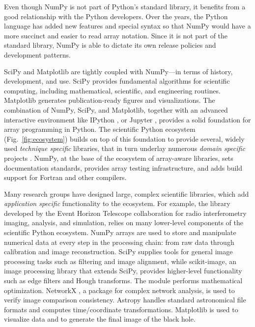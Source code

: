 Even though NumPy is not part of Python's standard library,
it benefits from a good relationship with the Python developers.
Over the years, the Python language has added new features and
special syntax so that NumPy would have a more succinct and 
easier to read array notation.
Since it is not part of the standard library, NumPy is able to
dictate its own release policies and development patterns.

SciPy and Matplotlib are tightly coupled with NumPy---in terms of
history, development, and use.
SciPy provides fundamental algorithms for scientific computing,
including mathematical, scientific, and engineering routines.
Matplotlib generates publication-ready figures and visualizations.
The combination of NumPy, SciPy, and Matplotlib, together with
an advanced interactive environment like IPython \cite{perez2007ipython},
or Jupyter \cite{Kluyver:2016aa}, provides a solid foundation for array
programming in Python.
The scientific Python ecosystem (Fig.~\ref{fig:ecosystem}) builds on top of
this foundation to provide several, widely used \emph{technique specific}
libraries\cite{pedregosa2011scikit,vanderwalt2014scikit,SciPyProceedings_11},
that in turn underlay numerous \emph{domain specific} projects
\cite{astropy:2013,astropy:2018,cock2009biopython,millman2007analysis,sunpy2015,2018EGUGA..2012146H}.
NumPy, at the base of the ecosystem of array-aware libraries,
sets documentation standards, provides array testing infrastructure,
and adds build support for Fortran and other compilers.

Many research groups have designed large,
complex scientific libraries, which add \emph{application specific} functionality
to the ecosystem.
For example, the  library \cite{chael2019ehtim} developed by
the Event Horizon Telescope collaboration for radio interferometry imaging,
analysis, and simulation, relies on many lower-level components of the scientific Python
ecosystem.
NumPy arrays are used to store and manipulate numerical data at every step
in the processing chain: from raw data through calibration and image
reconstruction.
SciPy supplies tools for general image processing tasks such as
filtering and image alignment, while scikit-image, an image processing
library that extends SciPy, provides higher-level functionality such as
edge filters and Hough transforms.
The  module performs mathematical optimization.
NetworkX \cite{SciPyProceedings_11}, a package for complex
network analysis, is used to verify image comparison consistency.
Astropy \cite{astropy:2013, astropy:2018} handles standard
astronomical file formats and computes time/coordinate transformations.
Matplotlib is used to visualize data and to generate the final image of the black hole.

